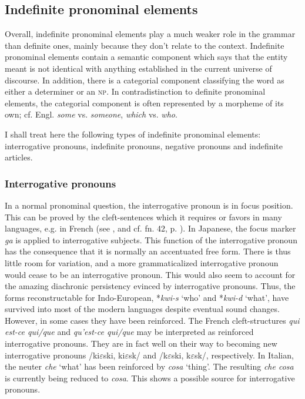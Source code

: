 \subsection{Indefinite pronominal elements}

Overall, indefinite pronominal elements play a much weaker role in the grammar than definite ones, mainly because they don't relate to the context. Indefinite pronominal elements contain a semantic component which says that the entity meant is not identical with anything established in the current universe of discourse. In addition, there is a categorial component classifying the word as either a determiner or an \textsc{np}. In contradistinction to definite pronominal elements, the categorial component is often represented by a morpheme of its own; cf. Engl. \textit{some} vs. \textit{someone}, \textit{which} vs. \textit{who}.

I shall treat here the following types of indefinite pronominal elements: interrogative pronouns, indefinite pronouns, negative pronouns and indefinite articles.

\subsubsection{Interrogative pronouns}
In a normal pronominal question, the interrogative pronoun is in focus position. This can be proved by the cleft-sentences which it requires or favors in many languages, e.g. in French (see \citealt{Sasse1977b}, and cf. fn. 42, p. \pageref{page125}\chk%
). In Japanese, the focus marker \textit{ga} is applied to interrogative subjects. This function of the interrogative pronoun has the consequence that it is normally an accentuated free form. There is thus little room for variation, and a more grammaticalized interrogative pronoun would cease to be an interrogative pronoun. This would also seem to account for the amazing diachronic persistency evinced by interrogative pronouns. Thus, the forms reconstructable for Indo-European, *\textit{kwi-s} ‘who’ and *\textit{kwi-d} ‘what’, have survived into most of the modern languages despite eventual sound changes. However, in some cases they have been reinforced. The French cleft-structures \textit{qui est-ce qui/que} and \textit{qu'est-ce qui/que} may be interpreted as reinforced interrogative pronouns. They are in fact well on their way to becoming new interrogative pronouns /ki$\varepsilon $ski, ki$\varepsilon $sk/ and /k$\varepsilon $ski, k$\varepsilon $sk/, respectively. In Italian, the neuter \textit{che} ‘what’ has been reinforced by \textit{cosa} ‘thing’. The resulting \textit{che cosa} is currently being reduced to \textit{cosa}. This shows a possible source for interrogative pronouns.

